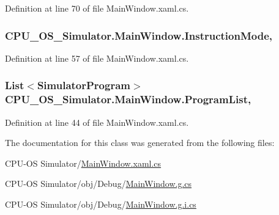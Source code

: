 Definition at line 70 of file Main\+Window.\+xaml.\+cs.

\hypertarget{class_c_p_u___o_s___simulator_1_1_main_window_a65916937137002c26f9eb1c88cfff519}{}
\subsubsection[{Instruction\+Mode}]{ C\+P\+U\+\_\+\+O\+S\+\_\+\+Simulator.\+Main\+Window.\+Instruction\+Mode\hspace{0.3cm}{\ttfamily [get]}, {\ttfamily [set]}}\label{class_c_p_u___o_s___simulator_1_1_main_window_a65916937137002c26f9eb1c88cfff519}


Definition at line 57 of file Main\+Window.\+xaml.\+cs.

\hypertarget{class_c_p_u___o_s___simulator_1_1_main_window_a632c91cdd16a7498bbb8dfb3e5df252c}{}
\subsubsection[{Program\+List}]{\setlength{\rightskip}{0pt plus 5cm}List$<${\bf Simulator\+Program}$>$ C\+P\+U\+\_\+\+O\+S\+\_\+\+Simulator.\+Main\+Window.\+Program\+List\hspace{0.3cm}{\ttfamily [get]}, {\ttfamily [set]}}\label{class_c_p_u___o_s___simulator_1_1_main_window_a632c91cdd16a7498bbb8dfb3e5df252c}


Definition at line 44 of file Main\+Window.\+xaml.\+cs.



The documentation for this class was generated from the following files\+:\begin{DoxyCompactItemize}
\item 
C\+P\+U-\/\+O\+S Simulator/\hyperlink{_main_window_8xaml_8cs}{Main\+Window.\+xaml.\+cs}\item 
C\+P\+U-\/\+O\+S Simulator/obj/\+Debug/\hyperlink{_main_window_8g_8cs}{Main\+Window.\+g.\+cs}\item 
C\+P\+U-\/\+O\+S Simulator/obj/\+Debug/\hyperlink{_main_window_8g_8i_8cs}{Main\+Window.\+g.\+i.\+cs}\end{DoxyCompactItemize}
